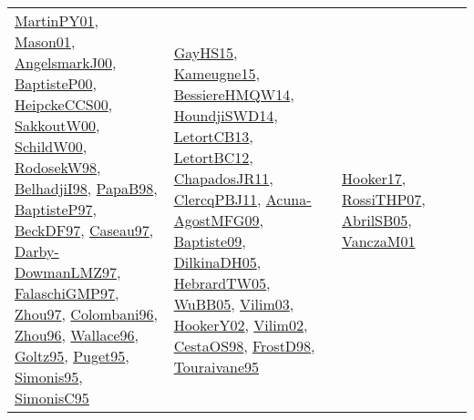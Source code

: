 {\begin{longtable}{llp{6cm}p{6cm}p{6cm}}
\href{articles/MartinPY01.pdf}{MartinPY01}\cite{MartinPY01}, \href{articles/Mason01.pdf}{Mason01}\cite{Mason01}, \href{papers/AngelsmarkJ00.pdf}{AngelsmarkJ00}\cite{AngelsmarkJ00}, \href{articles/BaptisteP00.pdf}{BaptisteP00}\cite{BaptisteP00}, \href{articles/HeipckeCCS00.pdf}{HeipckeCCS00}\cite{HeipckeCCS00}, \href{articles/SakkoutW00.pdf}{SakkoutW00}\cite{SakkoutW00}, \href{articles/SchildW00.pdf}{SchildW00}\cite{SchildW00}, \href{papers/RodosekW98.pdf}{RodosekW98}\cite{RodosekW98}, \href{articles/BelhadjiI98.pdf}{BelhadjiI98}\cite{BelhadjiI98}, \href{articles/PapaB98.pdf}{PapaB98}\cite{PapaB98}, \href{papers/BaptisteP97.pdf}{BaptisteP97}\cite{BaptisteP97}, \href{papers/BeckDF97.pdf}{BeckDF97}\cite{BeckDF97}, \href{papers/Caseau97.pdf}{Caseau97}\cite{Caseau97}, \href{articles/Darby-DowmanLMZ97.pdf}{Darby-DowmanLMZ97}\cite{Darby-DowmanLMZ97}, \href{articles/FalaschiGMP97.pdf}{FalaschiGMP97}\cite{FalaschiGMP97}, \href{articles/Zhou97.pdf}{Zhou97}\cite{Zhou97}, \href{papers/Colombani96.pdf}{Colombani96}\cite{Colombani96}, \href{papers/Zhou96.pdf}{Zhou96}\cite{Zhou96}, \href{articles/Wallace96.pdf}{Wallace96}\cite{Wallace96}, \href{papers/Goltz95.pdf}{Goltz95}\cite{Goltz95}, \href{papers/Puget95.pdf}{Puget95}\cite{Puget95}, \href{papers/Simonis95.pdf}{Simonis95}\cite{Simonis95}, \href{papers/SimonisC95.pdf}{SimonisC95}\cite{SimonisC95} & \href{papers/GayHS15.pdf}{GayHS15}\cite{GayHS15}, \href{articles/Kameugne15.pdf}{Kameugne15}\cite{Kameugne15}, \href{papers/BessiereHMQW14.pdf}{BessiereHMQW14}\cite{BessiereHMQW14}, \href{papers/HoundjiSWD14.pdf}{HoundjiSWD14}\cite{HoundjiSWD14}, \href{papers/LetortCB13.pdf}{LetortCB13}\cite{LetortCB13}, \href{papers/LetortBC12.pdf}{LetortBC12}\cite{LetortBC12}, \href{papers/ChapadosJR11.pdf}{ChapadosJR11}\cite{ChapadosJR11}, \href{papers/ClercqPBJ11.pdf}{ClercqPBJ11}\cite{ClercqPBJ11}, \href{papers/Acuna-AgostMFG09.pdf}{Acuna-AgostMFG09}\cite{Acuna-AgostMFG09}, \href{papers/Baptiste09.pdf}{Baptiste09}\cite{Baptiste09}, \href{papers/DilkinaDH05.pdf}{DilkinaDH05}\cite{DilkinaDH05}, \href{papers/HebrardTW05.pdf}{HebrardTW05}\cite{HebrardTW05}, \href{papers/WuBB05.pdf}{WuBB05}\cite{WuBB05}, \href{papers/Vilim03.pdf}{Vilim03}\cite{Vilim03}, \href{papers/HookerY02.pdf}{HookerY02}\cite{HookerY02}, \href{papers/Vilim02.pdf}{Vilim02}\cite{Vilim02}, \href{papers/CestaOS98.pdf}{CestaOS98}\cite{CestaOS98}, \href{papers/FrostD98.pdf}{FrostD98}\cite{FrostD98}, \href{papers/Touraivane95.pdf}{Touraivane95}\cite{Touraivane95} & \href{papers/Hooker17.pdf}{Hooker17}\cite{Hooker17}, \href{papers/RossiTHP07.pdf}{RossiTHP07}\cite{RossiTHP07}, \href{papers/AbrilSB05.pdf}{AbrilSB05}\cite{AbrilSB05}, \href{papers/VanczaM01.pdf}{VanczaM01}\cite{VanczaM01}\\

\end{longtable}}
